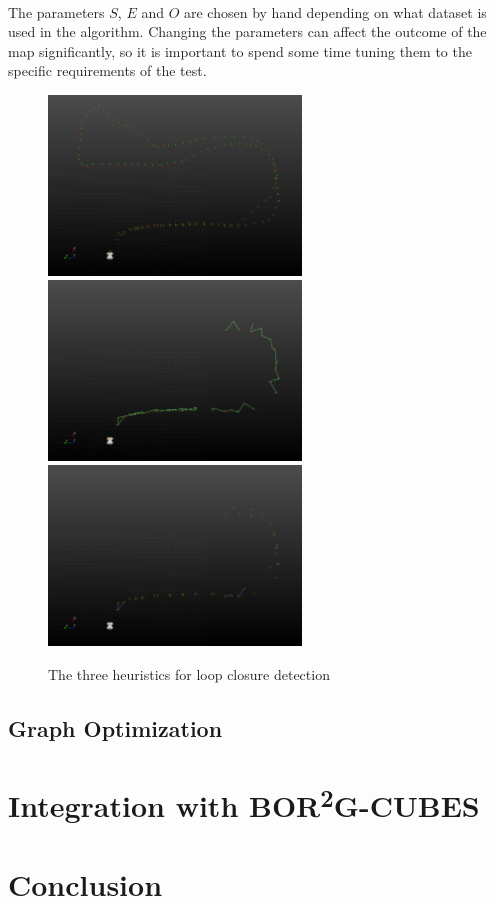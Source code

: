 \documentclass[11pt]{article}
\begin{document}
	\paragraph{}
	The parameters $S$, $E$ and $O$ are chosen by hand depending on what dataset is used in the algorithm. Changing the parameters can affect the outcome of the map significantly, so it is important to spend some time tuning them to the specific requirements of the test.

	\begin{figure}[htp]

	\centering
	\includegraphics[width=0.6\textwidth]{LoopClosureTimeSampling}\hfill
	\includegraphics[width=0.6\textwidth]{LoopClosureEuclideanSampling}\hfill
	\includegraphics[width=0.6\textwidth]{LoopClosureFinal}

	\caption{The three heuristics for loop closure detection}
	\label{fig:loopClosureDetection}

	\end{figure}
	
	\subsection{Graph Optimization}

	\newpage
	\section{Integration with BOR\textsuperscript{2}G-CUBES}
	
	\newpage
	\section{Conclusion}

	\newpage
	
	
\end{document}
